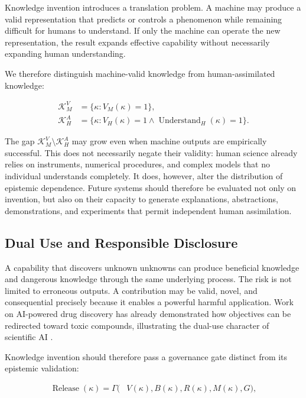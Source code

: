 Knowledge invention introduces a translation problem. A machine may produce a
valid representation that predicts or controls a phenomenon while remaining
difficult for humans to understand. If only the machine can operate the new
representation, the result expands effective capability without necessarily
expanding human understanding.

We therefore distinguish machine-valid knowledge from human-assimilated
knowledge:

\begin{equation}
\begin{aligned}
\mathcal{K}_{M}^{V}
&=\{\kappa:V_M(\kappa)=1\},\\
\mathcal{K}_{H}^{A}
&=\{\kappa:V_H(\kappa)=1
\land \operatorname{Understand}_H(\kappa)=1\}.
\end{aligned}
\label{eq:machine_human_knowledge_gap}
\end{equation}

The gap $\mathcal{K}_{M}^{V}\setminus\mathcal{K}_{H}^{A}$ may grow even when
machine outputs are empirically successful. This does not necessarily negate
their validity: human science already relies on instruments, numerical
procedures, and complex models that no individual understands completely. It
does, however, alter the distribution of epistemic dependence. Future systems
should therefore be evaluated not only on invention, but also on their capacity
to generate explanations, abstractions, demonstrations, and experiments that
permit independent human assimilation.

\subsection{\textbf{Dual Use and Responsible Disclosure}}

A capability that discovers unknown unknowns can produce beneficial knowledge
and dangerous knowledge through the same underlying process. The risk is not
limited to erroneous outputs. A contribution may be valid, novel, and
consequential precisely because it enables a powerful harmful application.
Work on AI-powered drug discovery has already demonstrated how objectives can
be redirected toward toxic compounds, illustrating the dual-use character of
scientific AI \cite{urbina2022dualuse}.

Knowledge invention should therefore pass a governance gate distinct from its
epistemic validation:

\begin{equation}
\begin{aligned}
\operatorname{Release}(\kappa)
=\Gamma(&V(\kappa),B(\kappa),R(\kappa),
M(\kappa),G),
\end{aligned}
\label{eq:release_governance}
\end{equation}

